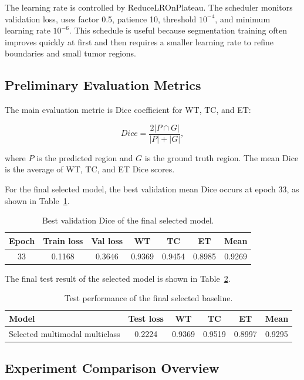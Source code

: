 The learning rate is controlled by ReduceLROnPlateau. The scheduler monitors validation loss, uses factor 0.5, patience 10, threshold \(10^{-4}\), and minimum learning rate \(10^{-6}\). This schedule is useful because segmentation training often improves quickly at first and then requires a smaller learning rate to refine boundaries and small tumor regions.

\subsection{Preliminary Evaluation Metrics}

The main evaluation metric is Dice coefficient for WT, TC, and ET:

\[
Dice = \frac{2|P \cap G|}{|P|+|G|},
\]

where \(P\) is the predicted region and \(G\) is the ground truth region. The mean Dice is the average of WT, TC, and ET Dice scores.

For the final selected model, the best validation mean Dice occurs at epoch 33, as shown in Table~\ref{tab:bestval}.

\begin{table}[h]
\centering
\begin{tabular}{ccccccc}
\hline
Epoch & Train loss & Val loss & WT & TC & ET & Mean \\
\hline
33 & 0.1168 & 0.3646 & 0.9369 & 0.9454 & 0.8985 & 0.9269 \\
\hline
\end{tabular}
\caption{Best validation Dice of the final selected model.}
\label{tab:bestval}
\end{table}

The final test result of the selected model is shown in Table~\ref{tab:finaltest}.

\begin{table}[h]
\centering
\begin{tabular}{lccccc}
\hline
Model & Test loss & WT & TC & ET & Mean \\
\hline
Selected multimodal multiclass & 0.2224 & 0.9369 & 0.9519 & 0.8997 & 0.9295 \\
\hline
\end{tabular}
\caption{Test performance of the final selected baseline.}
\label{tab:finaltest}
\end{table}

\subsection{Experiment Comparison Overview}

